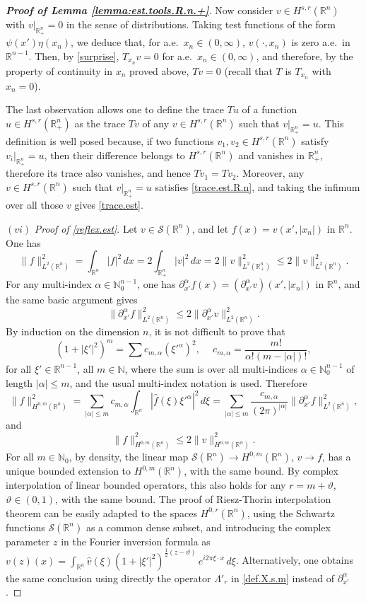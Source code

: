\documentclass[10pt,reqno,a4paper]{article}
\numberwithin{equation}{section}
\theoremstyle{plain}
\theoremstyle{definition}
\newcommand{\N}{{\mathbb N}}
\newcommand{\R}{{\mathbb R}}
\newcommand{\mS}{\mathcal{S}}
\renewcommand{\a}{\alpha}
\newcommand{\Lm}{\Lambda}
\renewcommand{\th}{\vartheta}
\newcommand{\pa}{\partial}
\begin{document}
\begin{proof}[\textbf{Proof of Lemma \ref{lemma:est.tools.R.n.+}}]
Now consider $v \in H^{s,r}(\R^n)$ with $v|_{\R^n_+} = 0$ in the sense of distributions.  
Taking test functions of the form $\psi(x') \eta(x_n)$, we deduce that, for a.e.\ $x_n \in (0,\infty)$,  
$v(\cdot, x_n)$ is zero a.e.\ in $\R^{n-1}$. Then, by \eqref{surprise}, 
$T_{x_n} v = 0$ for a.e.\ $x_n \in (0,\infty)$, and therefore, 
by the property of continuity in $x_n$ proved above, 
$Tv=0$ (recall that $T$ is $T_{x_n}$ with $x_n=0$). 

The last observation allows one to define the trace $Tu$ of a function $u \in H^{s,r}(\R^n_+)$ 
as the trace $Tv$ of any $v \in H^{s,r}(\R^n)$ such that $v|_{\R^n_+} = u$. 
This definition is well posed because, if two functions $v_1, v_2 \in H^{s,r}(\R^n)$ 
satisfy $v_i|_{\R^n_+} = u$, then their difference belongs to $H^{s,r}(\R^n)$ 
and vanishes in $\R^n_+$, therefore its trace also vanishes, and hence $T v_1 = T v_2$. 
Moreover, any $v \in H^{s,r}(\R^n)$ such that $v|_{\R^n_+} = u$ satisfies \eqref{trace.est.R.n}, 
and taking the infimum over all those $v$ gives \eqref{trace.est}.

\medskip

$(vi)$ \emph{Proof of \eqref{reflex.est}}. 
Let $v \in \mS(\R^n)$, and let $f(x) = v(x', |x_n|)$ in $\R^n$. 
One has 
\[
\| f \|_{L^2(\R^n)}^2 
= \int_{\R^n} |f|^2 \, dx 
= 2 \int_{\R^n_+} |v|^2 \, dx 
= 2 \| v \|_{L^2(\R^n_+)}^2 
\leq 2 \| v \|_{L^2(\R^n)}^2.
\]
For any multi-index $\alpha \in \N_0^{n-1}$, 
one has $\pa_{x'}^\alpha f(x) = (\pa_{x'}^\alpha v) (x',|x_n|)$ in $\R^n$, 
and the same basic argument gives  
\[
\| \pa_{x'}^\alpha f \|_{L^2(\R^n)}^2 
\leq 2 \| \pa_{x'}^\alpha v \|_{L^2(\R^n)}^2.
\]
By induction on the dimension $n$, it is not difficult to prove that  
\[
(1 + |\xi'|^2)^m = \sum c_{m,\alpha} (\xi'^\alpha)^2, \quad \ 
c_{m,\alpha} = \frac{m!}{\alpha! (m-|\alpha|)!},
\]
for all $\xi' \in \R^{n-1}$, all $m \in \N$,    
where the sum is over all multi-indices $\alpha \in \N_0^{n-1}$ of length $|\alpha| \leq m$, 
and the usual multi-index notation is used.
Therefore
\[
\| f \|_{H^{0,m}(\R^n)}^2 
= \sum_{|\a| \leq m} c_{m,\a} \int_{\R^n} |\hat f(\xi) \xi'^\a |^2 \, d\xi 
= \sum_{|\a| \leq m} \frac{ c_{m,\a} }{ (2\pi)^{|\alpha|} } \| \pa_{x'}^\alpha f \|_{L^2(\R^n)}^2,
\]
and 
\[
\| f \|_{H^{0,m}(\R^n)}^2 
\leq 2 \| v \|_{H^{0,m}(\R^n)}^2.
\]
For all $m \in \N_0$, by density, the linear map $\mS(\R^n) \to H^{0,m}(\R^n)$, $v \to f$, 
has a unique bounded extension to $H^{0,m}(\R^n)$, with the same bound. 
By complex interpolation of linear bounded operators, 
this also holds for any $r = m + \th$, $\th \in (0,1)$, with the same bound. 
The proof of Riesz-Thorin interpolation theorem can be easily adapted 
to the spaces $H^{0,r}(\R^n)$, using the Schwartz functions $\mS(\R^n)$ as a common dense subset, 
and introducing the complex parameter $z$ in the Fourier inversion formula as 
$v(z)(x) = \int_{\R^n} \hat v(\xi) (1+|\xi'|^2)^{\frac12 (z-\th)} \, e^{i 2\pi \xi \cdot x} \, d\xi$.
Alternatively, one obtains the same conclusion using directly the operator $\Lm'_r$ in \eqref{def.X.s.m}
instead of $\pa_{x'}^\alpha$. 


\end{proof}
\end{document}
